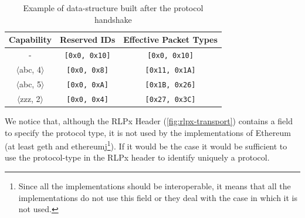 \begin{table}
  \begin{center}
    \begin{tabular}{c | c | c }
      Capability & Reserved IDs & Effective Packet Types\\
      \hline
      - & \texttt{[0x0, 0x10]} & \texttt{[0x0, 0x10]} \\
      $\langle$abc, 4$\rangle$ & \texttt{[0x0, 0x8]} & \texttt{[0x11, 0x1A]}  \\
      $\langle$abc, 5$\rangle$ & \texttt{[0x0, 0xA]} & \texttt{[0x1B, 0x26]}  \\
      $\langle$zzz, 2$\rangle$ & \texttt{[0x0, 0x4]}  & \texttt{[0x27, 0x3C]} \\
    \end{tabular}
    \caption{Example of data-structure built after the protocol handshake}
    \label{table:capabilities}
  \end{center}
\end{table}

We notice that, although the RLPx Header (\autoref{fig:rlpx-transport}) contains
a field to specify the protocol type, it is not used by the implementations of
Ethereum (at least geth and ethereumj\footnote{Since all the implementations
should be interoperable, it means that all the implementations do not use this
field or they deal with the case in which it is not used.}). If it would be the
case it would be sufficient to use the protocol-type in the RLPx header to
identify uniquely a protocol.
